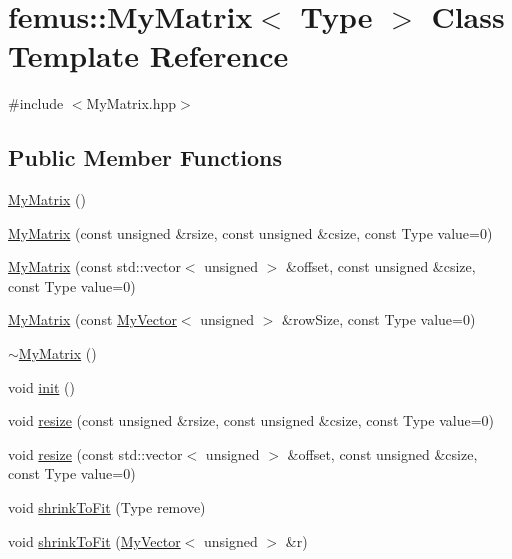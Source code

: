\hypertarget{classfemus_1_1_my_matrix}{}\section{femus\+:\+:My\+Matrix$<$ Type $>$ Class Template Reference}
\label{classfemus_1_1_my_matrix}


{\ttfamily \#include $<$My\+Matrix.\+hpp$>$}

\subsection*{Public Member Functions}
\begin{DoxyCompactItemize}
\item 
\mbox{\hyperlink{classfemus_1_1_my_matrix_a1233f8df540f69758f079b3b932ff851}{My\+Matrix}} ()
\item 
\mbox{\hyperlink{classfemus_1_1_my_matrix_a2ab151f14eac4d3c61504169435d2e52}{My\+Matrix}} (const unsigned \&rsize, const unsigned \&csize, const Type value=0)
\item 
\mbox{\hyperlink{classfemus_1_1_my_matrix_ad0294488e8e1fa7a5fd78a08ac23f677}{My\+Matrix}} (const std\+::vector$<$ unsigned $>$ \&offset, const unsigned \&csize, const Type value=0)
\item 
\mbox{\hyperlink{classfemus_1_1_my_matrix_a44785815b941b7f42b029668c1641abe}{My\+Matrix}} (const \mbox{\hyperlink{classfemus_1_1_my_vector}{My\+Vector}}$<$ unsigned $>$ \&row\+Size, const Type value=0)
\item 
\mbox{\hyperlink{classfemus_1_1_my_matrix_af6027611ab36fc1826b9efa278cd6a23}{$\sim$\+My\+Matrix}} ()
\item 
void \mbox{\hyperlink{classfemus_1_1_my_matrix_abf86f6c2ce5cfb335048ed948acd6d71}{init}} ()
\item 
void \mbox{\hyperlink{classfemus_1_1_my_matrix_af6eccdb4db1869148cc7fe22590c2625}{resize}} (const unsigned \&rsize, const unsigned \&csize, const Type value=0)
\item 
void \mbox{\hyperlink{classfemus_1_1_my_matrix_a1851b191f98045063f45f8e371fba98a}{resize}} (const std\+::vector$<$ unsigned $>$ \&offset, const unsigned \&csize, const Type value=0)
\item 
void \mbox{\hyperlink{classfemus_1_1_my_matrix_a1d1fc475d6e17481e0d6451d1dab3574}{shrink\+To\+Fit}} (Type remove)
\item 
void \mbox{\hyperlink{classfemus_1_1_my_matrix_a8e80e482668fee278634417a6df69367}{shrink\+To\+Fit}} (\mbox{\hyperlink{classfemus_1_1_my_vector}{My\+Vector}}$<$ unsigned $>$ \&r)

\end{DoxyCompactItemize}
